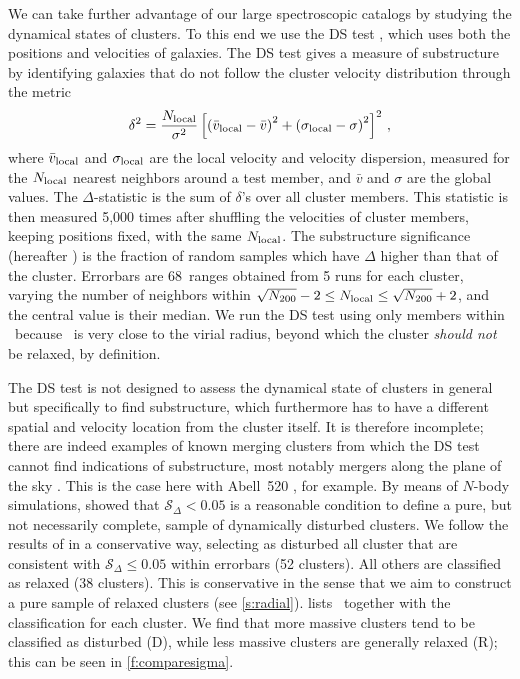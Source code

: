 We can take further advantage of our large spectroscopic catalogs by studying the dynamical states 
of clusters. To this end we use the DS test \citep{dressler88}, which uses both the positions and 
velocities of galaxies. The DS test gives a measure of substructure by identifying galaxies that do 
not follow the cluster velocity distribution through the metric
\begin{equation}\label{eq:ds}
 \delta^2 = \frac{N_{\rm local}}{\sigma^2}\left[\left(\bar v_{\rm local} - \bar v\right)^2 + 
\left(\sigma_{\rm local} - \sigma\right)^2\right]^2\,,
\end{equation}
where $\bar v_{\rm local}$ and $\sigma_{\rm local}$ are the local velocity and velocity dispersion, 
measured for the $N_{\rm local}$ nearest neighbors around a test member, and $\bar v$ and $\sigma$ 
are the global values. The $\Delta$-statistic is the sum of $\delta$'s over all cluster members. 
This statistic is then measured 5,000 times after shuffling the velocities of cluster members, 
keeping positions fixed, with the same $N_{\rm local}$. The substructure significance (hereafter 
\sdelta) is the fraction of random samples which have $\Delta$ higher than that of the cluster. 
Errorbars are 68\percent\ ranges obtained from 5 runs for each cluster, varying the number of neighbors 
within $\sqrt{N_{200}}-2 \leq N_{\rm local} \leq \sqrt{N_{200}}+2$, and the central value is their 
median. We run the DS test using only members within \radius\ because \radius\ is very close to the 
virial radius, beyond which the cluster \textit{should not} be relaxed, by definition.

The DS test is not designed to assess the dynamical state of clusters in general but specifically 
to find substructure, which furthermore has to have a different spatial and velocity location from 
the cluster itself. It is therefore incomplete; there are indeed examples of known merging clusters 
from which the DS test cannot find indications of substructure, most notably mergers along the 
plane of the sky \citep[e.g.,][]{menanteau12,barrena13}. This is the case here with Abell~520 
\citep[e.g.,][]{jee14_a520}, for example. By means of $N$-body simulations, \cite{pinkney96} showed that 
$\mathcal{S}_\Delta<0.05$ is a reasonable condition to define a pure, but not necessarily complete, 
sample of dynamically disturbed clusters. We follow the results of \cite{pinkney96} in a 
conservative way, selecting as disturbed all cluster that are consistent with 
$\mathcal{S}_\Delta\leq0.05$ within errorbars (52 clusters). All others are classified as relaxed 
(38 clusters). This is conservative in the sense that we aim to construct a pure sample of relaxed 
clusters (see \cref{s:radial}).  lists \sdelta\ together with the classification 
for each cluster. We find that more massive clusters tend to be classified as disturbed (D), while 
less massive clusters are generally relaxed (R); this can be seen in \cref{f:comparesigma}.


